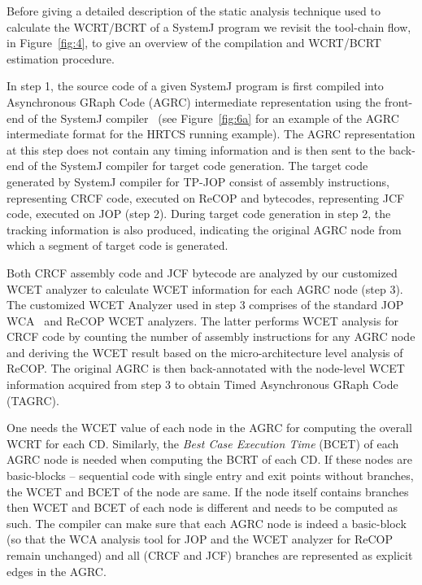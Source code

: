 Before giving a detailed description of the static analysis technique
used to calculate the WCRT/BCRT of a SystemJ program we revisit the
tool-chain flow, in Figure~\ref{fig:4}, to give an overview of the
compilation and WCRT/BCRT estimation procedure.

In step 1, the source code of a given SystemJ program is first compiled
into Asynchronous GRaph Code (AGRC) intermediate representation using
the front-end of the SystemJ compiler~\cite{amal10} (see
Figure~\ref{fig:6a} for an example of the AGRC intermediate format for
the HRTCS running example). The AGRC representation at this step does
not contain any timing information and is then sent to the back-end of
the SystemJ compiler for target code generation. The target code
generated by SystemJ compiler for TP-JOP consist of assembly
instructions, representing CRCF code, executed on ReCOP and bytecodes,
representing JCF code, executed on JOP (step 2). During target code
generation in step 2, the tracking information is also produced,
indicating the original AGRC node from which a segment of target code is
generated.

Both CRCF assembly code and JCF bytecode are analyzed by our customized
WCET analyzer to calculate WCET information for each AGRC node (step
3). The customized WCET Analyzer used in step 3 comprises of the
standard JOP WCA~\cite{jop:jnl:jsa2007} and ReCOP WCET analyzers. The
latter performs WCET analysis for CRCF code by counting the number of
assembly instructions for any AGRC node and deriving the WCET result
based on the micro-architecture level analysis of ReCOP. The original
AGRC is then back-annotated with the node-level WCET information
acquired from step 3 to obtain Timed Asynchronous GRaph Code (TAGRC). 


One needs the WCET value of each node in the AGRC for computing the
overall WCRT for each CD. Similarly, the \textit{Best Case Execution
  Time} (BCET) of each AGRC node is needed when computing the BCRT of
each CD. If these nodes are basic-blocks -- sequential code with single
entry and exit points without branches, the WCET and BCET of the node
are same. If the node itself contains branches then WCET and BCET of
each node is different and needs to be computed as such. The compiler
can make sure that each AGRC node is indeed a basic-block (so that the
WCA analysis tool for JOP and the WCET analyzer for ReCOP remain
unchanged) and all (CRCF and JCF) branches are represented as explicit
edges in the AGRC.

